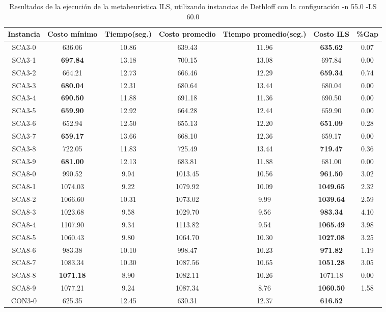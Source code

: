 \begin{table}[ht]
\caption{Resultados de la ejecución de la metaheurística ILS, utilizando instancias de Dethloff con la configuración -n 55.0 -LS 60.0}
\centering
\small
\begin{tabular}{c c c c c c c}
\hline\hline
Instancia & Costo mínimo & Tiempo(seg.) & Costo promedio & Tiempo promedio(seg.) & Costo ILS & \%Gap \\ [0.5ex]
\hline
SCA3-0 & 636.06 & 10.86 & 
639.43 & 11.96 & \bf{635.62} & 
0.07\\SCA3-1 & \bf{697.84} & 13.18 & 
700.15 & 13.08 & 697.84 & 0.00\\
SCA3-2 & 664.21 & 12.73 & 
666.46 & 12.29 & \bf{659.34} & 
0.74\\SCA3-3 & \bf{680.04} & 12.31 & 
680.64 & 13.44 & 680.04 & 0.00\\
SCA3-4 & \bf{690.50} & 11.88 & 
691.18 & 11.36 & 690.50 & 0.00\\
SCA3-5 & \bf{659.90} & 12.92 & 
664.28 & 12.44 & 659.90 & 0.00\\
SCA3-6 & 652.94 & 12.50 & 
655.13 & 12.20 & \bf{651.09} & 
0.28\\SCA3-7 & \bf{659.17} & 13.66 & 
668.10 & 12.36 & 659.17 & 0.00\\
SCA3-8 & 722.05 & 11.83 & 
725.49 & 13.44 & \bf{719.47} & 
0.36\\SCA3-9 & \bf{681.00} & 12.13 & 
683.81 & 11.88 & 681.00 & 0.00\\
SCA8-0 & 990.52 & 9.94 & 
1013.45 & 10.56 & \bf{961.50} & 
3.02\\SCA8-1 & 1074.03 & 9.22 & 
1079.92 & 10.09 & \bf{1049.65} & 
2.32\\SCA8-2 & 1066.60 & 10.31 & 
1073.02 & 9.99 & \bf{1039.64} & 
2.59\\SCA8-3 & 1023.68 & 9.58 & 
1029.70 & 9.56 & \bf{983.34} & 
4.10\\SCA8-4 & 1107.90 & 9.34 & 
1113.82 & 9.54 & \bf{1065.49} & 
3.98\\SCA8-5 & 1060.43 & 9.80 & 
1064.70 & 10.30 & \bf{1027.08} & 
3.25\\SCA8-6 & 983.38 & 10.10 & 
998.47 & 10.23 & \bf{971.82} & 
1.19\\SCA8-7 & 1083.34 & 10.30 & 
1087.56 & 10.65 & \bf{1051.28} & 
3.05\\SCA8-8 & \bf{1071.18} & 8.90 & 
1082.11 & 10.26 & 1071.18 & 0.00\\
SCA8-9 & 1077.21 & 9.24 & 
1087.34 & 8.76 & \bf{1060.50} & 
1.58\\CON3-0 & 625.35 & 12.45 & 
630.31 & 12.37 & \bf{616.52} & 

\end{tabular}
\end{table}
